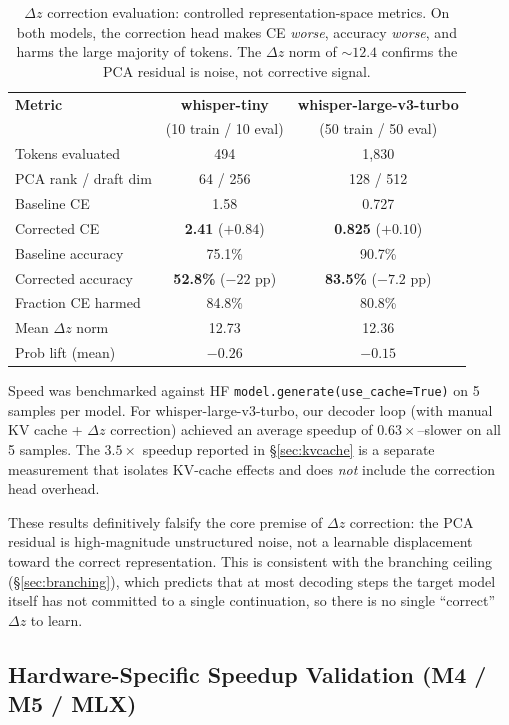 \documentclass[11pt,a4paper]{article}
\begin{document}
\begin{table}[H]
\centering
\small
\begin{tabular}{@{}lcc@{}}
\toprule
\textbf{Metric} & \textbf{whisper-tiny} & \textbf{whisper-large-v3-turbo} \\
& (10 train / 10 eval) & (50 train / 50 eval) \\
\midrule
Tokens evaluated & 494 & 1,830 \\
PCA rank / draft dim & 64 / 256 & 128 / 512 \\
Baseline CE & 1.58 & 0.727 \\
Corrected CE & \textbf{2.41} ($+0.84$) & \textbf{0.825} ($+0.10$) \\
Baseline accuracy & 75.1\% & 90.7\% \\
Corrected accuracy & \textbf{52.8\%} ($-22$ pp) & \textbf{83.5\%} ($-7.2$ pp) \\
Fraction CE harmed & 84.8\% & 80.8\% \\
Mean $\Delta z$ norm & 12.73 & 12.36 \\
Prob lift (mean) & $-0.26$ & $-0.15$ \\
\bottomrule
\end{tabular}
\caption{$\Delta z$ correction evaluation: controlled representation-space metrics.
On both models, the correction head makes CE \emph{worse}, accuracy \emph{worse}, and harms the large majority of tokens.
The $\Delta z$ norm of ${\sim}12.4$ confirms the PCA residual is noise, not corrective signal.}
\label{tab:dz_eval}
\end{table}

\noindent Speed was benchmarked against HF \texttt{model.generate(use\_cache=True)} on 5 samples per model.
For whisper-large-v3-turbo, our decoder loop (with manual KV cache + $\Delta z$ correction) achieved an average speedup of $0.63\times$--slower on all 5 samples.
The $3.5\times$ speedup reported in \S\ref{sec:kvcache} is a separate measurement that isolates KV-cache effects and does \emph{not} include the correction head overhead.

These results definitively falsify the core premise of $\Delta z$ correction: the PCA residual is high-magnitude unstructured noise, not a learnable displacement toward the correct representation.
This is consistent with the branching ceiling (\S\ref{sec:branching}), which predicts that at most decoding steps the target model itself has not committed to a single continuation, so there is no single ``correct'' $\Delta z$ to learn.

\subsection{Hardware-Specific Speedup Validation (M4 / M5 / MLX)}
\end{document}
